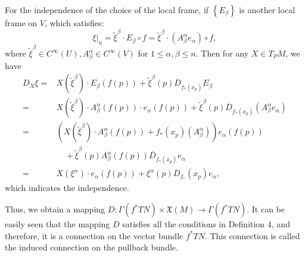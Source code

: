 \documentclass{ctexart}
\begin{document}
For the independence of the choice of the local frame, if $\left\{E_\beta\right\}$ is another local frame on $V$, which satisfies:
$$
\left.\xi\right|_u=\tilde{\xi}^\beta \cdot E_\beta \circ f=\tilde{\xi}^\beta \cdot\left(A_\beta^\alpha e_\alpha\right) \circ f,
$$
where $\tilde{\xi}^\beta \in C^\infty(U), A_\beta^\alpha \in C^\infty(V)$ for $1 \leq \alpha,\beta \leq n$.
Then for any $X \in T_P M$, we have
$$
\begin{aligned}
D_X \xi
= & X\left(\tilde{\xi}^\beta\right) \cdot E_\beta(f(p))+\tilde{\xi}^\beta(p) \overline{D}_{f_*\left(x_p\right)} E_\beta \\
= & X\left(\tilde{\xi}^\beta\right) \cdot A_\beta^\alpha(f(p)) \cdot e_\alpha(f(p))+\tilde{\xi}^\beta(p) \overline{D}_{f_*\left(x_p\right)}\left(A_\beta^\alpha e_\alpha\right) \\
= & \left(X\left(\tilde{\xi}^\beta\right) \cdot A_\beta^\alpha(f(p))+f_*\left(x_p\right)\left(A_\beta^\alpha\right)\right) e_\alpha(f(p)) \\
& \quad + \tilde{\xi}^\beta(p) A_\beta^\alpha(f(p)) \overline{D}_{f_*\left(x_p\right)} e_\alpha \\
= & X\left(\xi^\alpha\right) \cdot e_\alpha(f(p))+\xi^\alpha(p) \overline{D}_{f_*}\left(x_p\right) e_\alpha,
\end{aligned}
$$
which indicates the independence. 

Thus, we obtain a mapping $D: \Gamma(f^* TN) \times \mathfrak{X}(M) \rightarrow \Gamma(f^* TN)$. It can be easily seen that 
the mapping $D$ satisfies all the conditions in Definition 4, and therefore, it is a connection on the vector bundle $f^* TN$. 
This connection is called the induced connection on the pullback bundle.
\end{document}
